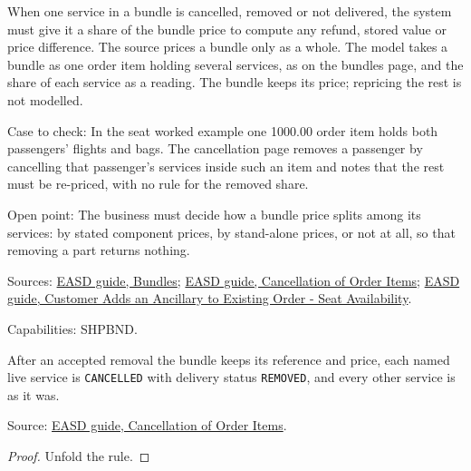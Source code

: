 \begin{definition}
  \label{def:ancillaries-bundle-part-value}
  When one service in a bundle is cancelled, removed or not delivered, the
  system must give it a share of the bundle price to compute any refund,
  stored value or price difference. The source prices a bundle only as a
  whole.
  The model takes a bundle as one order item holding several services, as
  on the bundles page, and the share of each service as a reading.  The
  bundle keeps its price; repricing the rest is not modelled.

  Case to check: In the seat worked example one 1000.00 order item holds
  both passengers' flights and bags. The cancellation page removes a
  passenger by cancelling that passenger's services inside such an item and
  notes that the rest must be re-priced, with no rule for the removed share.

  Open point: The business must decide how a bundle price splits among its
  services: by stated component prices, by stand-alone prices, or not at
  all, so that removing a part returns nothing.

  Sources: \href{https://standards.atlassian.net/wiki/spaces/EASD/pages/574619818}{EASD guide, Bundles};
  \href{https://standards.atlassian.net/wiki/spaces/EASD/pages/574783569}{EASD guide, Cancellation of Order Items};
  \href{https://standards.atlassian.net/wiki/spaces/EASD/pages/842268814}{EASD guide, Customer Adds an Ancillary to Existing Order - Seat Availability}.

  Capabilities: SHPBND.
\end{definition}

\begin{theorem}
  \label{thm:ancillaries-bundle-removes}
  After an accepted removal the bundle keeps its reference and price, each
  named live service is \texttt{CANCELLED} with delivery status
  \texttt{REMOVED}, and every other service is as it was.

  Source: \href{https://standards.atlassian.net/wiki/spaces/EASD/pages/574783569}{EASD guide, Cancellation of Order Items}.
\end{theorem}
\begin{proof}
  Unfold the rule.
\end{proof}

